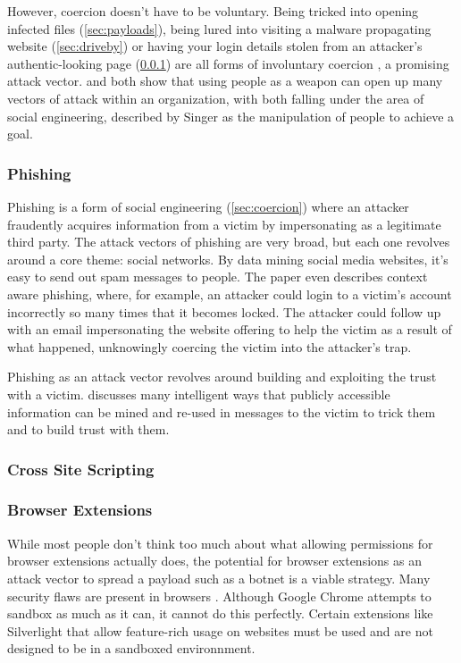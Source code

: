 \documentclass[a4paper, 11pt]{article}
\begin{document}
However, coercion doesn't have to be voluntary. Being tricked into opening infected files (\ref{sec:payloads}), being lured into visiting a malware propagating website (\ref{sec:driveby}) or having your login details stolen from an attacker's authentic-looking page (\ref{sec:phishing}) are all forms of involuntary coercion \cite{ref:jang2014survey,ref:singer2014cybersecurity}, a promising attack vector. \cite{ref:biometricattackvectors} and \cite{ref:jang2014survey} both show that using people as a weapon can open up many vectors of attack within an organization, with both falling under the area of social engineering, described by Singer \cite{ref:singer2014cybersecurity} as the manipulation of people to achieve a goal.

\subsubsection{Phishing}
\label{sec:phishing}
Phishing is a form of social engineering (\ref{sec:coercion}) where an attacker fraudently acquires information from a victim by impersonating as a legitimate third party. \cite{ref:phishing} The attack vectors of phishing are very broad, but each one revolves around a core theme: social networks. By data mining social media websites, it's easy to send out spam messages to people. \cite{ref:phishing} The paper even describes context aware phishing, where, for example, an attacker could login to a victim's account incorrectly so many times that it becomes locked. The attacker could follow up with an email impersonating the website offering to help the victim as a result of what happened, unknowingly coercing the victim into the attacker's trap.

Phishing as an attack vector revolves around building and exploiting the trust with a victim. \cite{ref:phishing} discusses many intelligent ways that publicly accessible information can be mined and re-used in messages to the victim to trick them and to build trust with them. 

\subsubsection{Cross Site Scripting}
\label{sec:xss}

\subsubsection{Browser Extensions}
\label{sec:extensions}
While most people don't think too much about what allowing permissions for browser extensions actually does, the potential for browser extensions as an attack vector to spread a payload such as a botnet is a viable strategy. Many security flaws are present in browsers \cite{ref:reis2009browser, ref:soghoian2007remote}. Although Google Chrome attempts to sandbox as much as it can, it cannot do this perfectly. Certain extensions like Silverlight that allow feature-rich usage on websites must be used and are not designed to be in a sandboxed environnment. \cite{ref:reis2009browser}
\end{document}
